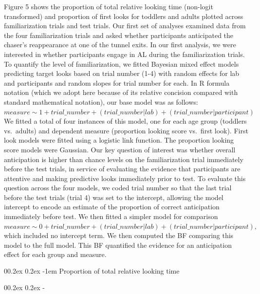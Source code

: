 \documentclass[
  english,
  man,floatsintext]{apa6}
\makeatletter
\let\oldparagraph\paragraph
\renewcommand{\paragraph}[1]{\oldparagraph{#1}\mbox{}}
\let\oldsubparagraph\subparagraph
\renewcommand{\subparagraph}[1]{\oldsubparagraph{#1}\mbox{}}
\renewcommand{\paragraph}{\@startsection{paragraph}{4}{\parindent}%
  {0\baselineskip \@plus 0.2ex \@minus 0.2ex}%
  {-1em}%
  {\normalfont\normalsize\bfseries\itshape\typesectitle}}
\renewcommand{\subparagraph}[1]{\@startsection{subparagraph}{5}{1em}%
  {0\baselineskip \@plus 0.2ex \@minus 0.2ex}%
  {-\z@\relax}%
  {\normalfont\normalsize\itshape\hspace{\parindent}{#1}\textit{\addperi}}{\relax}}
\makeatother
\begin{document}
Figure 5 shows the proportion of total relative looking time (non-logit transformed) and proportion of first looks for toddlers and adults plotted across familiarization trials and test trials. Our first set of analyses examined data from the four familiarization trials and asked whether participants anticipated the chaser's reappearance at one of the tunnel exits. In our first analysis, we were interested in whether participants engage in AL during the familiarization trials. To quantify the level of familiarization, we fitted Bayesian mixed effect models predicting target looks based on trial number (1-4) with random effects for lab and participants and random slopes for trial number for each.
In R formula notation (which we adopt here because of its relative concision compared with standard mathematical notation), our base model was as follows:
\(measure \sim 1 + trial\_number + (trial\_number | lab) + (trial\_number | participant)\)
We fitted a total of four instances of this model, one for each age group (toddlers vs.~adults) and dependent measure (proportion looking score vs.~first look). First look models were fitted using a logistic link function. The proportion looking score models were Gaussian.
Our key question of interest was whether overall anticipation is higher than chance levels on the familiarization trial immediately before the test trials, in service of evaluating the evidence that participants are attentive and making predictive looks immediately prior to test. To evaluate this question across the four models, we coded trial number so that the last trial before the test trials (trial 4) was set to the intercept, allowing the model intercept to encode an estimate of the proportion of correct anticipation immediately before test. We then fitted a simpler model for comparison
\(measure \sim 0 + trial\_number + (trial\_number | lab) + (trial\_number | participant),\)
which included no intercept term. We then computed the BF comparing this model to the full model. This BF quantified the evidence for an anticipation effect for each group and measure.

\hypertarget{proportion-of-total-relative-looking-time}{%
\paragraph{Proportion of total relative looking time}\label{proportion-of-total-relative-looking-time}}

\hypertarget{toddlers}{%
\subparagraph{Toddlers}\label{toddlers}}
\end{document}
